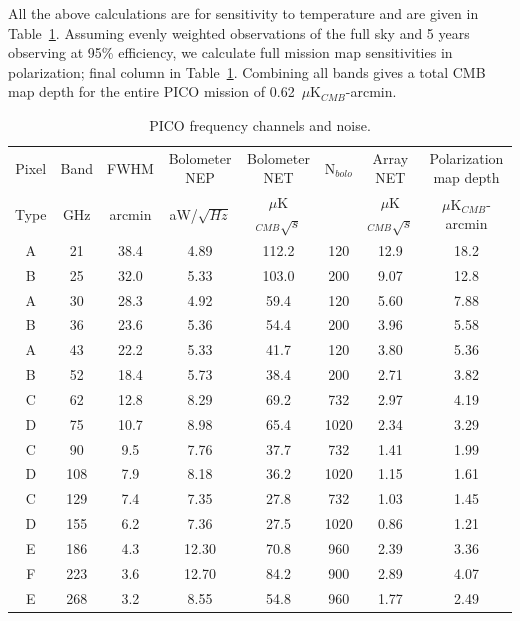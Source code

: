 \documentclass[]{spie}  %
\begin{document}
All the above calculations are for sensitivity to temperature and are given in Table~\ref{tab:noise}.  Assuming evenly weighted observations 
of the full sky and 5 years observing at 95\% efficiency, we calculate full mission map sensitivities in polarization; final column in Table~\ref{tab:noise}.
Combining all bands gives a total CMB map depth for the entire PICO mission of 0.62~$\mu$K$_{CMB}$-arcmin.

\begin{table}[ht]
\centering
\caption{PICO frequency channels and noise. }
\label{tab:noise}
\begin{tabular}{|c|c|c|c|c|c|c|c|}
\hline
Pixel  & Band  & FWHM   & Bolometer NEP & Bolometer NET        & N$_{bolo}$ & Array NET            & Polarization map depth  \\
Type   & GHz   & arcmin & aW/$\sqrt{Hz}$ & $\mu$K$_{CMB}\sqrt{s}$ &           & $\mu$K$_{CMB}\sqrt{s}$ & $\mu$K$_{CMB}$-arcmin      \\ \hline
A     & 21  & 38.4 & 4.89  & 112.2   & 120   & 12.9  & 18.2  \\
B     & 25  & 32.0 & 5.33  & 103.0   & 200   & 9.07   & 12.8  \\
A     & 30  & 28.3 & 4.92  & 59.4    & 120   & 5.60   & 7.88   \\
B     & 36  & 23.6 & 5.36  & 54.4    & 200   & 3.96   & 5.58   \\
A     & 43  & 22.2 & 5.33  & 41.7    & 120   & 3.80   & 5.36   \\
B     & 52  & 18.4 & 5.73  & 38.4    & 200   & 2.71   & 3.82   \\
C     & 62  & 12.8 & 8.29  & 69.2    & 732   & 2.97   & 4.19   \\
D     & 75  & 10.7 & 8.98  & 65.4    & 1020  & 2.34   & 3.29   \\
C     & 90  & 9.5  & 7.76  & 37.7    & 732   & 1.41   & 1.99   \\
D     & 108 & 7.9  & 8.18  & 36.2    & 1020  & 1.15   & 1.61   \\
C     & 129 & 7.4  & 7.35  & 27.8    & 732   & 1.03   & 1.45   \\
D     & 155 & 6.2  & 7.36  & 27.5    & 1020  & 0.86   & 1.21   \\
E     & 186 & 4.3  & 12.30 & 70.8    & 960   & 2.39   & 3.36   \\
F     & 223 & 3.6  & 12.70 & 84.2    & 900   & 2.89   & 4.07   \\
E     & 268 & 3.2  & 8.55  & 54.8    & 960   & 1.77   & 2.49   \\

\end{tabular}
\end{table}
\end{document}
